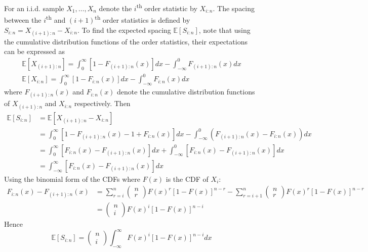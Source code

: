 \documentclass[11pt]{report} %
\begin{document}
For an i.i.d. sample $X_{1}, \dots, X_{n}$ denote the $i$\textsuperscript{th} order statistic by $X_{i:n}$. The spacing between the $i$\textsuperscript{th} and $\left(i + 1\right)$\textsuperscript{th} order statistics is defined by $S_{i:n} = X_{\left(i + 1\right):n} - X_{i:n}$. To find the expected spacing $\mathbb{E}\left[S_{i:n}\right]$, note that using the cumulative distribution functions of the order statistics, their expectations can be expressed as
\begin{gather}
\mathbb{E}\left[X_{\left(i+1\right):n}\right]=\int_{0}^{\infty}\left[1-F_{\left(i+1\right):n}\left(x\right)\right]dx-\int_{-\infty}^{0}F_{\left(i+1\right):n}\left(x\right)dx \\
\mathbb{E}\left[X_{i:n}\right]=\int_{0}^{\infty}\left[1-F_{i:n}\left(x\right)\right]dx-\int_{-\infty}^{0}F_{i:n}\left(x\right)dx
\end{gather}
where $F_{\left(i+1\right):n}\left(x\right)$ and $F_{i:n}\left(x\right)$ denote the cumulative distribution functions of $X_{\left(i+1\right):n}$ and $X_{i:n}$ respectively. Then
\begin{align}
\mathbb{E}\left[S_{i:n}\right] &= \mathbb{E}\left[X_{\left(i+1\right):n}-X_{i:n}\right] \\
&= \int_{0}^{\infty}\left[1-F_{\left(i+1\right):n}\left(x\right)-1+F_{i:n}\left(x\right)\right]dx-\int_{-\infty}^{0}\left(F_{\left(i+1\right):n}\left(x\right)-F_{i:n}\left(x\right)\right)dx \\
&= \int_{0}^{\infty}\left[F_{i:n}\left(x\right)-F_{\left(i+1\right):n}\left(x\right)\right]dx+\int_{-\infty}^{0}\left[F_{i:n}\left(x\right)-F_{\left(i+1\right):n}\left(x\right)\right]dx \\
&= \int_{-\infty}^{\infty}\left[F_{i:n}\left(x\right)-F_{\left(i+1\right):n}\left(x\right)\right]dx
\end{align}
Using the binomial form of the CDFs where $F\left(x\right)$ is the CDF of $X_{i}$:
\begin{align}
F_{i:n}\left(x\right)-F_{\left(i+1\right):n}\left(x\right) &= \sum_{r=i}^{n}\begin{pmatrix}n\\r\end{pmatrix}F\left(x\right)^{r}\left[1-F\left(x\right)\right]^{n-r}-\sum_{r=i+1}^{n}\begin{pmatrix}n\\r\end{pmatrix}F\left(x\right)^{r}\left[1-F\left(x\right)\right]^{n-r} \\
&= \begin{pmatrix}n\\i\end{pmatrix}F\left(x\right)^{i}\left[1-F\left(x\right)\right]^{n-i}
\end{align}
Hence
\begin{equation}
\mathbb{E}\left[S_{i:n}\right] = \begin{pmatrix}n\\i\end{pmatrix}\int_{-\infty}^{\infty}F\left(x\right)^{i}\left[1-F\left(x\right)\right]^{n-i}dx
\end{equation}
\end{document}
